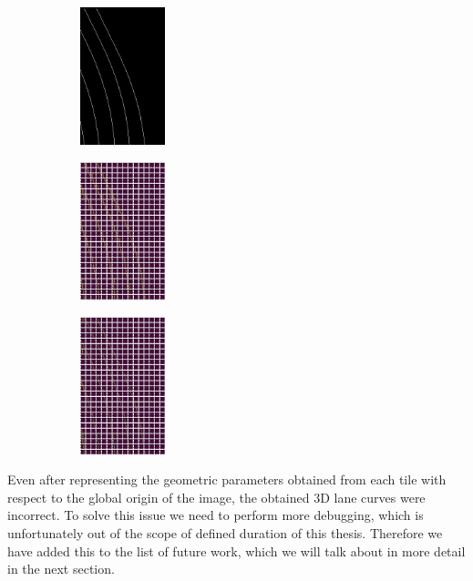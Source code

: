 \begin{figure}[h]
      \caption{(a) Binary lane segmentation mask (b) Detected lanes via Hough Transform (c) Detected lanes via Hough Transform and using Hesse normal form as a post processing step }
        \centering
        \begin{subfigure}{0.2\textwidth}
        \includegraphics[width=1\linewidth, height=4cm]{images/test_bev_lanes.jpeg} 
        \caption{}
        \label{fig:subim1}
        \end{subfigure}
        \begin{subfigure}{0.2\textwidth}
        \includegraphics[width=1\linewidth,height=4cm]{images/detected_lines_r.jpg}
        \caption{}
        \label{fig:subim2}
        \end{subfigure}
        \begin{subfigure}{0.2\textwidth}
        \includegraphics[width=1\linewidth,height=4cm]{images/detected_lines_rprime.jpg}
        \caption{}
        \label{fig:subim2}
        \end{subfigure}
        \end{figure}
        
Even after representing the geometric parameters obtained from each tile with respect to the global origin of the image, the obtained 3D lane curves were incorrect. To solve this issue we need to perform more debugging, which is unfortunately out of the scope of defined duration of this thesis. Therefore we have added this to the list of future work, which we will talk about in more detail in the next section.

